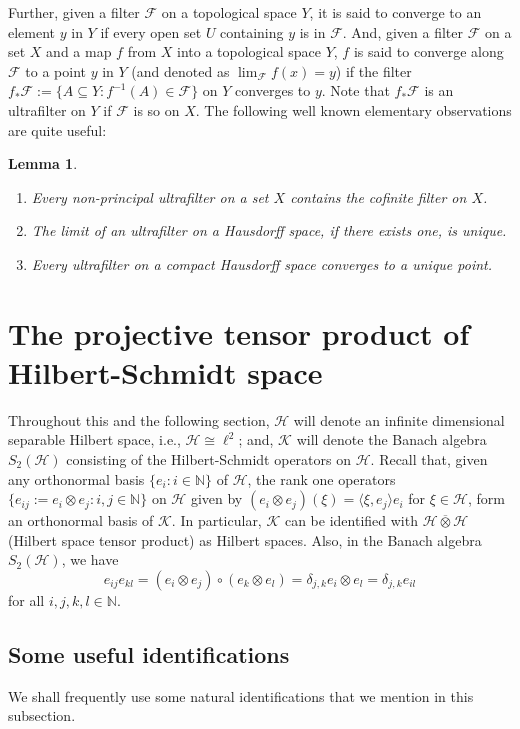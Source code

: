 \documentclass[a4]{amsart}
\theoremstyle{cupthm}
\newtheorem{lemma}[thm]{Lemma}
\theoremstyle{cupdefn}
\theoremstyle{cuprem}
\numberwithin{equation}{section}
\newcommand{\N}{\mathbb N}
\newcommand{\mH}{\mathcal{H}}
\newcommand{\mK}{\mathcal{K}}
\def\la{\langle}
\def\ra{\rangle}
\begin{document}
Further, given a filter $\mathcal{F}$ on a topological space $Y$, it
is said to converge to an element $y$ in $Y$ if every open set $U$
containing $y$ is in $\mathcal{F}$. And, given a filter $\mathcal{F}$
on a set $X$ and a map $f$ from $ X$ into a topological space $ Y$,
$f$ is said to converge along $\mathcal{F}$ to a point $y$ in $Y$ (and
denoted as $\lim_{\mathcal F}f(x) = y$) if the filter $f_*
\mathcal{F}:=\{ A\subseteq Y: f^{-1}(A) \in \mathcal{F}\}$ on $Y$
converges to $y$. Note that $f_*\mathcal{F}$ is an ultrafilter on $Y$
if $\mathcal{F}$ is so on $X$. The following well known elementary
observations are quite useful:
\begin{lemma} \label{ultrafilter-limit}
  \begin{enumerate}
\item Every non-principal ultrafilter on a set $X$ contains the
  cofinite filter on $X$.
    \item The limit of an ultrafilter on a Hausdorff space, if there
      exists one, is unique.
\item Every ultrafilter on a compact Hausdorff space converges to
  a unique point.
  \end{enumerate}
\end{lemma}
  
  \section{The projective tensor product of Hilbert-Schmidt space}
Throughout this and the following section, $\mathcal H $ will denote
an infinite dimensional separable Hilbert space, i.e., $\mH \cong
\ell^2$; and, $\mK$ will denote the Banach algebra $S_2(\mathcal H)$
consisting of the Hilbert-Schmidt operators on $\mH$.  Recall that,
given any orthonormal basis $\{e_i: i \in \N\}$ of $\mathcal H$, the
rank one operators $\{e_{ij}:=e_i\otimes e_j : i, j\in \N \}$ on $\mH$
given by $(e_i\otimes e_j)(\xi) =\la \xi, e_j\ra e_i$ for $\xi \in
\mH$, form an orthonormal basis of $\mK$. In particular, $\mK$ can be
identified with $\mH \overline{\otimes} \mH$ (Hilbert space tensor
product) as Hilbert spaces. Also, in the Banach algebra $S_2(\mH)$, we
have
  \begin{equation}\label{e-ij-relations}
e_{ij} e_{kl} = (e_i \otimes e_j) \circ (e_k \otimes e_l) = \delta_{j,
  k} e_i \otimes e_l = \delta_{j, k}e_{il}
 \end{equation}
 for all $i, j, k, l \in\N$.

\subsection{Some useful identifications}
  We shall frequently use some natural identifications that we mention
  in this subsection.
\end{document}
